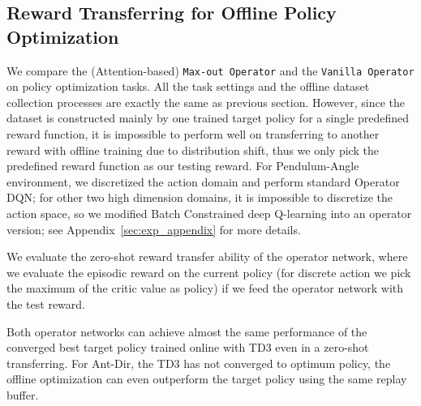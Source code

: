 \subsection{Reward Transferring for Offline Policy Optimization}
We compare the (Attention-based) {\tt Max-out Operator} and the {\tt Vanilla Operator}
on policy optimization tasks. 
All the task settings and the offline dataset collection processes 
are exactly the same as previous section.
However, since the dataset is constructed mainly by one trained target policy for a single predefined reward function, it is impossible to perform well on transferring to another reward with offline training due to distribution shift, thus we only pick the predefined reward function as our testing reward.
For Pendulum-Angle environment, we discretized the action domain and perform standard Operator DQN; for other two high dimension domains, it is impossible to discretize the action space, so we modified Batch Constrained deep Q-learning\citep{fujimoto2019off} into an operator version; see Appendix~\ref{sec:exp_appendix} for more details.

We evaluate the zero-shot reward transfer ability of the operator network, where we evaluate the episodic reward on the current policy (for discrete action we pick the maximum of the critic value as policy) if we feed the operator network with the test reward.

Both operator networks can achieve almost the same performance of the converged best target policy trained online with TD3 even in a zero-shot transferring.
For Ant-Dir, the TD3 has not converged to optimum policy, the offline optimization can even outperform the target policy using the same replay buffer.
